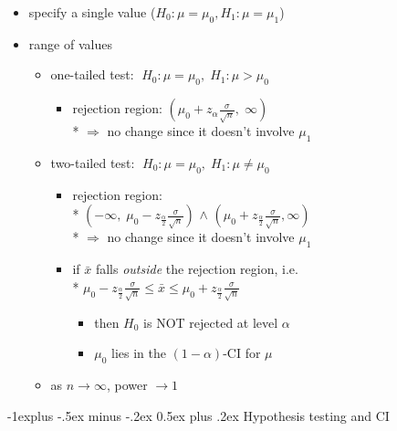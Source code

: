 \documentclass[10pt, landscape]{article}
\makeatletter
\renewcommand{\subsection}{\@startsection{subsection}{2}{0mm}%
  {-1explus -.5ex minus -.2ex}%
  {0.5ex plus .2ex}%
{\normalfont\normalsize\bfseries}}
\newcommand{\xbar}{\bar{x}}
\makeatother
\begin{document}
\begin{multicols*}{4}
  \begin{itemize}
    \item {} specify a single value 
      ($H_0 : \mu = \mu_0, H_1 : \mu = \mu_1$)
    \item {} range of values 
      \begin{itemize}
        \item one-tailed test: $\; H_0 : \mu = \mu_0, \; H_1 : \mu > \mu_0$
          \begin{itemize}
            \item rejection region: $(\mu_0 + z_{\alpha}\frac{\sigma}{\sqrt n}, \; \infty)$ 
              \\* $\Rightarrow$ no change since it doesn't involve $\mu_1$
          \end{itemize}
        \item two-tailed test: $\; H_0 : \mu = \mu_0, \; H_1 : \mu \neq \mu_0$
          \begin{itemize}
            \item rejection region: 
              \\* $\scriptstyle (-\infty,\; \mu_0 - z_{\frac{\alpha}{2}}\frac{\sigma}{\sqrt n})$ $\land$ $\scriptstyle (\mu_0 + z_{\frac{\alpha}{2}}\frac{\sigma}{\sqrt n}, \infty)$
              \\* $\Rightarrow$ no change since it doesn't involve $\mu_1$
            \item if $\xbar$ falls \textit{outside} the rejection region, i.e.
              \\* $\mu_0 - z_{\frac{\alpha}{2}}\frac{\sigma}{\sqrt n} \leq \xbar \leq \mu_0 + z_{\frac{\alpha}{2}}\frac{\sigma}{\sqrt n}$
              \begin{itemize}
                \item then $H_0$ is NOT rejected at level $\alpha$
                \item $\mu_0$ lies in the $(1-\alpha)$-CI for $\mu$
              \end{itemize}
          \end{itemize}
        \item as $n \to \infty$, power  $\to 1$
      \end{itemize}
  \end{itemize}

  \subsection{Hypothesis testing and CI}


\end{multicols*}
\end{document}
